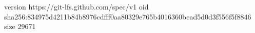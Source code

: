 version https://git-lfs.github.com/spec/v1
oid sha256:834975d4211b84b8976cdfff0aa80329e765b4016360bead5d0d3f556f5f8846
size 29671

